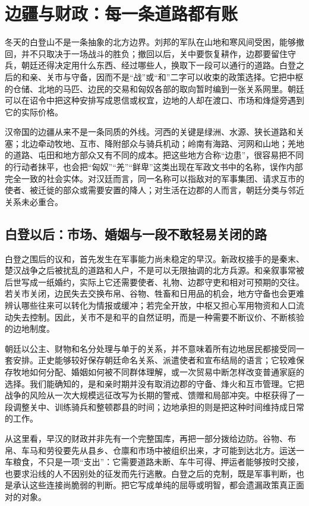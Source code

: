 \section{边疆与财政：每一条道路都有账}
\label{sec:synthesis-frontier-fiscal}

冬天的白登山不是一条抽象的北方边界。刘邦的军队在山地和寒风间受困，能够撤回，并不只取决于一场战斗的胜负；撤回以后，关中要恢复耕作，边郡要留住守兵，朝廷还得决定用什么东西、经过哪些人，换取下一段可以通行的道路。白登之后的和亲、关市与守备，因而不是“战”或“和”二字可以收束的政策选择。它把中枢的仓储、北地的马匹、边民的交易和匈奴各部的取向暂时编到一张关系网里。朝廷可以在诏令中把这种安排写成恩信或权宜，边地的人却在渡口、市场和烽燧旁遇到它的实际价格。

汉帝国的边疆从来不是一条同质的外线。河西的关键是绿洲、水源、狭长道路和关塞；北边牵动牧地、互市、降附部众与骑兵机动；岭南有海路、河网和山地；羌地的道路、屯田和地方部众又有不同的成本。把这些地方合称“边患”，很容易把不同的行动者抹平，也会把“匈奴”“羌”“鲜卑”这类出现在军政文书中的名称，误作内部完全一致的社会实体。对汉廷而言，同一名称可以指敌对的军事集团、请求互市的使者、被迁徙的部众或需要安置的降人；对生活在边郡的人而言，朝廷分类与邻近关系未必重合。

\subsection{白登以后：市场、婚姻与一段不敢轻易关闭的路}

白登之围后的议和，首先发生在军事能力尚未稳定的早汉。新政权接手的是秦末、楚汉战争之后被扰乱的道路和人户，不是可以无限抽调的北方兵源。和亲叙事常被后世写成一纸婚约，实际上它还需要使者、礼物、边郡守吏和相对可预期的交往。若关市关闭，边民失去交换布帛、谷物、牲畜和日用品的机会，地方守备也会更难辨认哪些往来可以转化为情报或缓冲；若完全开放，中枢又担心军用物资和人口流动失去控制。因此，关市不是和平的自然证明，而是一种需要不断议价、不断核验的边地制度。

朝廷以公主、财物和名分处理与单于的关系，并不意味着所有边地居民都接受同一套安排。正史能够较好保存朝廷命名关系、派遣使者和宣布结局的语言；它较难保存牧地如何分配、婚姻如何被不同群体理解，或一次贸易中断怎样改变普通家庭的选择。我们能确知的，是和亲时期并没有取消边郡的守备、烽火和互市管理。它把战争的风险从一次大规模远征改写为长期的警戒、馈赠和局部冲突。中枢获得了一段调整关中、训练骑兵和整顿郡县的时间；边地承担的则是把这种时间维持成日常的工作。

从这里看，早汉的财政并非先有一个完整国库，再把一部分拨给边防。谷物、布帛、车马和劳役要先从县乡、仓廪和市场中被组织出来，才可能到达北方。运送一车粮食，不只是一项“支出”：它需要道路未断、车牛可得、押运者能够按时交接，也要求沿线的人不因别处的征发而先行逃散。白登之后的克制，既是军事判断，也是承认这些连接尚脆弱的判断。把它写成单纯的屈辱或明智，都会遗漏政策真正面对的对象。

